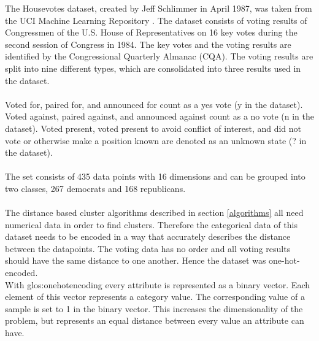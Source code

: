 
The Housevotes dataset, created by Jeff Schlimmer in April 1987, was taken from the UCI Machine Learning Repository \cite{Dua2019}. The dataset consists of voting results of Congressmen of the U.S. House of Representatives on 16 key votes during the second session of Congress in 1984. The key votes and the voting results are identified by the Congressional Quarterly Almanac (CQA). The voting results are split into nine different types, which are consolidated into three results used in the dataset.\\
\ \\
Voted for, paired for, and announced for count as a yes vote (y in the dataset).
Voted against, paired against, and announced against count as a no vote (n in the dataset).
Voted present, voted present to avoid conflict of interest, and did not vote or otherwise make a position known are denoted as an unknown state (? in the dataset).\\
\ \\
The set consists of 435 data points with 16 dimensions and can be grouped into two classes, 267 democrats and 168 republicans.\\
\ \\
The distance based cluster algorithms described in section \ref{algorithms} all need numerical data in order to find clusters. Therefore the categorical data of this dataset needs to be encoded in a way that accurately describes the distance between the datapoints. The voting data has no order and all voting results should have the same distance to one another. Hence the dataset was one-hot-encoded.\\
With \Gls{glos:onehotencoding} every attribute is represented as a binary vector. Each element of this vector represents a category value. The corresponding value of a sample is set to 1 in the binary vector. 
This increases the dimensionality of the problem, but represents an equal distance between every value an attribute can have.\\

